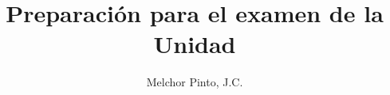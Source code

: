 \documentclass[12pt,addpoints]{repaso}
\title{Preparación para el examen de la Unidad}
\author{Melchor Pinto, J.C.}
\begin{document}
\INFO
\begin{questions}
    \questionboxed[10]{}
    \ejemplosboxed[]
    \questionboxed[10]{}
    \questionboxed[4]{}
    \questionboxed[4]{}
    \questionboxed[4]{}
    \ejemplosboxed[]
    \questionboxed[20]{}
    \ejemplosboxed[]
    \questionboxed[5]{}
    \ejemplosboxed[]
    \questionboxed[5]{}
    \questionboxed[4]{}
    \questionboxed[4]{}
    \questionboxed[30]{}
\end{questions}
\end{document}
